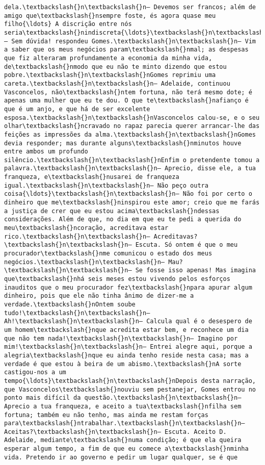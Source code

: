 \documentclass[11pt]{article}
\begin{document}
\begin{Verbatim}[commandchars=\\\{\}]
dela.\textbackslash{}n\textbackslash{}n— Devemos ser francos; além de amigo que\textbackslash{}nsempre foste, és agora quase meu filho{\ldots} A discrição entre nós seria\textbackslash{}nindiscreta{\ldots}\textbackslash{}n\textbackslash{}n— Sem dúvida! respondeu Gomes.\textbackslash{}n\textbackslash{}n— Vim a saber que os meus negócios param\textbackslash{}nmal; as despesas que fiz alteraram profundamente a economia da minha vida, de\textbackslash{}nmodo que eu não te minto dizendo que estou pobre.\textbackslash{}n\textbackslash{}nGomes reprimiu uma careta.\textbackslash{}n\textbackslash{}n— Adelaide, continuou Vasconcelos, não\textbackslash{}ntem fortuna, não terá mesmo dote; é apenas uma mulher que eu te dou. O que te\textbackslash{}nafianço é que é um anjo, e que há de ser excelente esposa.\textbackslash{}n\textbackslash{}nVasconcelos calou-se, e o seu olhar\textbackslash{}ncravado no rapaz parecia querer arrancar-lhe das feições as impressões da alma.\textbackslash{}n\textbackslash{}nGomes devia responder; mas durante alguns\textbackslash{}nminutos houve entre ambos um profundo silêncio.\textbackslash{}n\textbackslash{}nEnfim o pretendente tomou a palavra.\textbackslash{}n\textbackslash{}n— Aprecio, disse ele, a tua franqueza, e\textbackslash{}nusarei de franqueza igual.\textbackslash{}n\textbackslash{}n— Não peço outra coisa{\ldots}\textbackslash{}n\textbackslash{}n— Não foi por certo o dinheiro que me\textbackslash{}ninspirou este amor; creio que me farás a justiça de crer que eu estou acima\textbackslash{}ndessas considerações. Além de que, no dia em que eu te pedi a querida do meu\textbackslash{}ncoração, acreditava estar rico.\textbackslash{}n\textbackslash{}n— Acreditavas?\textbackslash{}n\textbackslash{}n— Escuta. Só ontem é que o meu procurador\textbackslash{}nme comunicou o estado dos meus negócios.\textbackslash{}n\textbackslash{}n— Mau?\textbackslash{}n\textbackslash{}n— Se fosse isso apenas! Mas imagina que\textbackslash{}nhá seis meses estou vivendo pelos esforços inauditos que o meu procurador fez\textbackslash{}npara apurar algum dinheiro, pois que ele não tinha ânimo de dizer-me a verdade.\textbackslash{}nOntem soube tudo!\textbackslash{}n\textbackslash{}n— Ah!\textbackslash{}n\textbackslash{}n— Calcula qual é o desespero de um homem\textbackslash{}nque acredita estar bem, e reconhece um dia que não tem nada!\textbackslash{}n\textbackslash{}n— Imagino por mim!\textbackslash{}n\textbackslash{}n— Entrei alegre aqui, porque a alegria\textbackslash{}nque eu ainda tenho reside nesta casa; mas a verdade é que estou à beira de um abismo.\textbackslash{}nA sorte castigou-nos a um tempo{\ldots}\textbackslash{}n\textbackslash{}nDepois desta narração, que Vasconcelos\textbackslash{}nouviu sem pestanejar, Gomes entrou no ponto mais difícil da questão.\textbackslash{}n\textbackslash{}n— Aprecio a tua franqueza, e aceito a tua\textbackslash{}nfilha sem fortuna; também eu não tenho, mas ainda me restam forças para\textbackslash{}ntrabalhar.\textbackslash{}n\textbackslash{}n— Aceitas?\textbackslash{}n\textbackslash{}n— Escuta. Aceito D. Adelaide, mediante\textbackslash{}numa condição; é que ela queira esperar algum tempo, a fim de que eu comece a\textbackslash{}nminha vida. Pretendo ir ao governo e pedir um lugar qualquer, se é que 
\end{Verbatim}
\end{document}
